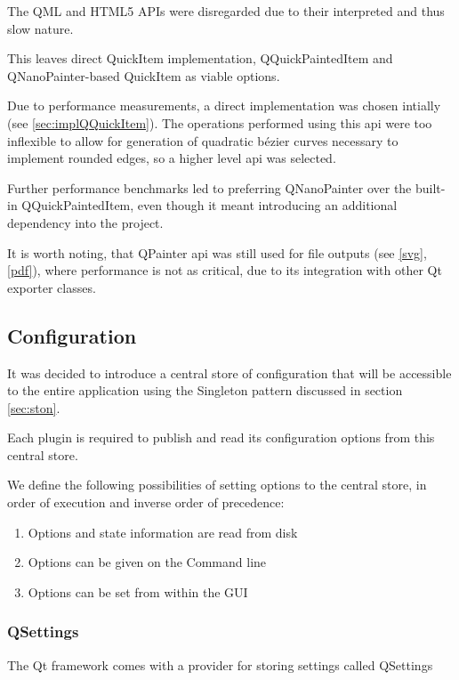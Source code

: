 The QML and HTML5 APIs were disregarded due to their interpreted and thus slow nature.

This leaves direct QuickItem implementation, QQuickPaintedItem and QNanoPainter-based QuickItem as viable options.

Due to performance measurements, a direct implementation was chosen intially (see \ref{sec:implQQuickItem}). The operations performed using this \gls{api} were too inflexible to allow for generation of quadratic bézier curves necessary to implement rounded edges, so a higher level \gls{api} was selected.

Further performance benchmarks led to preferring QNanoPainter over the built-in QQuickPaintedItem, even though it meant introducing an additional dependency into the project.

It is worth noting, that QPainter \gls{api} was still used for file outputs (see \ref{svg}, \ref{pdf}), where performance is not as critical, due to its integration with other Qt exporter classes.

\subsection{Configuration}
It was decided to introduce a central store of configuration that will be accessible to the entire application using the Singleton pattern discussed in section \ref{sec:ston}.

Each plugin is required to publish and read its configuration options from this central store.

We define the following possibilities of setting options to the central store, in order of execution and inverse order of precedence:
\begin{enumerate}
	\item Options and state information are read from disk
	\item Options can be given on the Command line
	\item Options can be set from within the GUI
\end{enumerate}

\subsubsection{QSettings}
The Qt framework comes with a provider for storing settings called QSettings 

